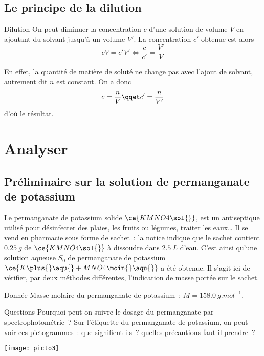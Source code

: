 \documentclass[a4paper, 11pt, final, garamond]{book}
\begin{document}
\subsection{Le principe de la dilution}

\begin{rprop}{Dilution}
    On peut diminuer la concentration $c$ d'une solution de volume $V$ en
    ajoutant du solvant jusqu'à un volume $V'$. La concentration $c'$
    obtenue est alors
    \[\boxed{cV = c'V'}
      \Longleftrightarrow
      \boxed{\frac{c}{c'} = \frac{V'}{V}}
  \]
\end{rprop}

En effet, la quantité de matière de soluté ne change pas avec l'ajout de
solvant, autrement dit $n$ est constant. On a donc
\[ c = \frac{n}{V} \qqet c' = \frac{n}{V'}\]
d'où le résultat.

\section{Analyser}

\subsection{Préliminaire sur la solution de permanganate de potassium}

Le permanganate de potassium solide $\ce{KMNO4\sol{}}$, est un antiseptique utilisé pour désinfecter des plaies, les fruits ou
légumes, traiter les eaux… Il se vend en pharmacie sous forme de sachet~: la
notice indique que le sachet contient $\SI{0.25}{g}$ de $\ce{KMNO4\sol{}}$ à
dissoudre dans $\SI{2.5}{L}$ d'eau. C'est ainsi qu'une solution aqueuse $S_0$ de permanganate de
potassium $\ce{K\plus{}\aqu{} + MNO4\moin{}\aqu{}}$ a été obtenue.
Il s'agit ici de vérifier, par deux méthodes différentes, l'indication de masse portée sur le sachet.

\medskip
\begin{rdefi}{\tiny Donnée}
    Masse molaire du permanganate de potassium~: $M = \SI{158,0}{g.mol^{-1}}$.
\end{rdefi}

\begin{minipage}{0.45\linewidth}
    \begin{rexem}{Questions}
        Pourquoi peut-on suivre le dosage du permanganate par
        spectrophotométrie~? Sur l'étiquette du permanganate de potassium, on
        peut voir ces pictogrammes~: que signifient-ils~? quelles précautions
        faut-il prendre~?
    \end{rexem}
\end{minipage}
\begin{minipage}{0.55\linewidth}
    \begin{center}
        \texttt{[image: picto3]}
    \end{center}
\end{minipage}
\end{document}
